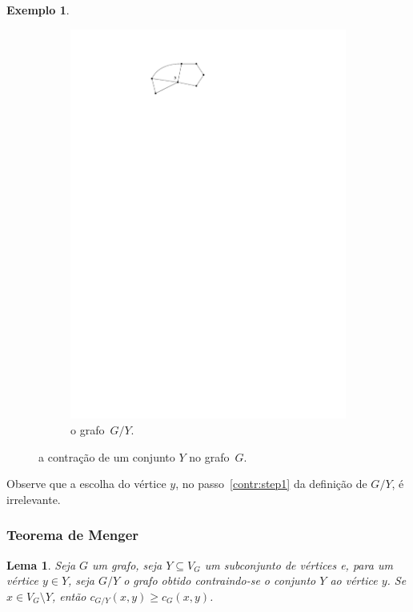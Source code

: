 \documentclass[12pt, a4paper]{article}
\newtheorem{lema}[teor]{Lema}
\theoremstyle{definition}
\newtheorem{exem}[teor]{Exemplo}
\begin{document}
\begin{exem}
\begin{figure}[H]
\begin{subfigure}{.5\textwidth}
  \includegraphics[]{contraido.pdf}
  \caption{o grafo~$G/Y$.}
  \label{fig:contr2}
\end{subfigure}
\caption{a contração de um conjunto $Y$ no grafo~$G$.}
\label{fig:contr}
\end{figure}
\end{exem}

\noindent Observe que a escolha do vértice $y$, no passo~\ref{contr:step1} da definição de $G/Y$, é irrelevante. 

\subsubsection {Teorema de Menger}


\begin{lema}
\label{lema:c_contracted}
Seja $G$ um grafo, seja $Y \subseteq V_G$ um subconjunto de vértices e, para um vértice $y \in Y$, seja $G/Y$ o grafo obtido contraindo-se o conjunto $Y$ ao vértice $y$. Se $x \in V_G \setminus Y$, então $c_{G/Y}(x,y) \geq c_G(x,y)$.
\end{lema}
\end{document}
